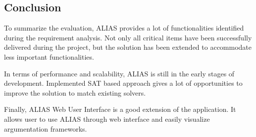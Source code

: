 \subsection{Conclusion}
To summarize the evaluation, ALIAS provides a lot of functionalities identified during the requirement analysis. Not only all critical items have been successfully delivered during the project, but the solution has been extended to accommodate less important functionalities. 

In terms of performance and scalability, ALIAS is still in the early stages of development. Implemented SAT based approach gives a lot of opportunities to improve the solution to match existing solvers.

Finally, ALIAS Web User Interface is a good extension of the application. It allows user to use ALIAS through web interface and easily visualize argumentation frameworks.